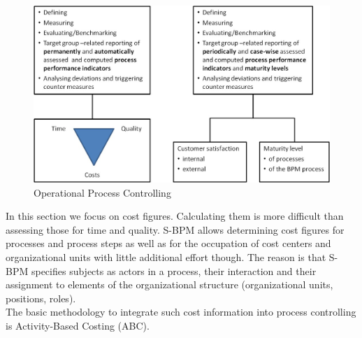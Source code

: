\begin{figure}[htbp]
	\centering
	\includegraphics[width=0.6\linewidth] {Figures/Chapter5/ActivityBased/OpProcessCont.jpg}
	\caption[Operational Process Controlling]{Operational Process Controlling}
	\label{fig:OpProcessCont}
\end{figure}

In this section we focus on cost figures. Calculating them is more difficult than assessing those for time and quality. S-BPM allows determining cost figures for processes and process steps as well as for the occupation of cost centers and organizational units with little additional effort though. The reason is that S-BPM specifies subjects as actors in a process, their interaction and their assignment to elements of the organizational structure (organizational units, positions, roles). 
\\
The basic methodology to integrate such cost information into process controlling is Activity-Based Costing (ABC).


